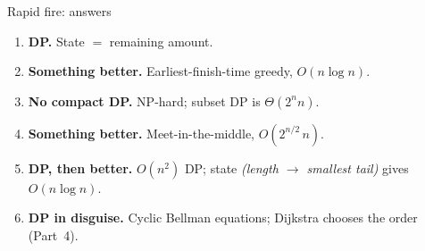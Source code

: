 \begin{frame}{Rapid fire: answers}
	\begin{enumerate}
		\item \textbf{DP.} State $=$ remaining amount.
		\item \textbf{Something better.} Earliest-finish-time greedy, $O(n\log n)$.
		\item \textbf{No compact DP.} NP-hard; subset DP is $\Theta(2^nn)$.
		\item \textbf{Something better.} Meet-in-the-middle, $O(2^{n/2}\,n)$.
		\item \textbf{DP, then better.} $O(n^2)$ DP; state \emph{(length $\to$ smallest tail)} gives $O(n\log n)$.
		\item \textbf{DP in disguise.} Cyclic Bellman equations; Dijkstra chooses the order (Part~4).
	\end{enumerate}
\end{frame}
